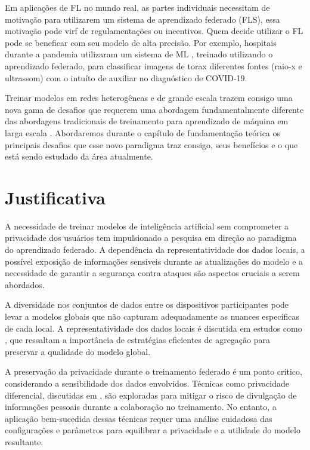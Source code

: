 Em aplicações de FL no mundo real, as partes individuais necessitam de motivação para utilizarem um  sistema de aprendizado federado (FLS), essa motivação pode virf de regulamentações ou incentivos. Quem decide utilizar o FL pode se beneficar com seu modelo de alta precisão\cite{LI}. Por exemplo, hospitais durante a pandemia utilizaram um sistema de ML , treinado utilizando o aprendizado federado, para classificar imagens de torax diferentes fontes (raio-x e ultrassom) com o intuíto de auxiliar no diagnóstico de COVID-19\cite{qayyum2022collaborative}.

Treinar modelos em redes heterogêneas e de grande escala trazem consigo uma nova gama de desafios que requerem uma abordagem fundamentalmente diferente das abordagens tradicionais de treinamento para aprendizado de máquina em larga escala \cite{li3}. Abordaremos durante o capítulo de fundamentação teórica os principais desafios que esse novo paradigma traz consigo, seus benefícios e o que está sendo estudado da área atualmente.

\section{Justificativa}
\label{sec:justificativa}

A necessidade de treinar modelos de inteligência artificial sem comprometer a privacidade dos usuários tem impulsionado a pesquisa em direção ao paradigma do aprendizado federado. A dependência da representatividade dos dados locais, a possível exposição de informações sensíveis durante as atualizações do modelo e a necessidade de garantir a segurança contra ataques são aspectos cruciais a serem abordados.

A diversidade nos conjuntos de dados entre os dispositivos participantes pode levar a modelos globais que não capturam adequadamente as nuances específicas de cada local. A representatividade dos dados locais é discutida em estudos como \cite{mcmahan2017communication}, que ressaltam a importância de estratégias eficientes de agregação para preservar a qualidade do modelo global.

A preservação da privacidade durante o treinamento federado é um ponto crítico, considerando a sensibilidade dos dados envolvidos. Técnicas como privacidade diferencial, discutidas em \cite{shokri2015privacy}, são exploradas para mitigar o risco de divulgação de informações pessoais durante a colaboração no treinamento. No entanto, a aplicação bem-sucedida dessas técnicas requer uma análise cuidadosa das configurações e parâmetros para equilibrar a privacidade e a utilidade do modelo resultante.

